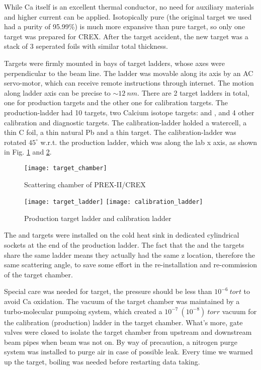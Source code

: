 While Ca itself is an excellent thermal conductor, no need for auxiliary 
materials and higher current can be applied. Isotopically pure \Ca (the original
target we used had a purity of 95.99\%) is much more 
expansive than pure \Pb target, so only one \Ca target was prepared for CREX. 
After the target accident, 
the new \Ca target was a stack of 3 seperated foils with similar total thickness.

Targets were firmly mounted in bays of target ladders, whose axes were 
perpendicular to the beam line. The ladder was movable along its axis by an 
AC servo-motor, which can receive remote instructions through internet. 
The motion along ladder axis can be precise to $\sim12\ nm$.
There are 2 target ladders in total, one for production targets and the other
one for calibration targets. The production-ladder had 10 \Pb targets, 
two Calcium isotope targets: \ca and \Ca, and 4 other calibration and diagnostic
targets. The calibration-ladder holded a watercell, a thin C foil, a thin natural 
Pb and a thin \ca target.
The calibration-ladder was rotated $45^\circ$ w.r.t. the production ladder, 
which was along the lab x axis, as shown in Fig. \ref{fig:scattering_chamber}
and \ref{fig:target_ladder}.

\begin{figure}[h!]
    \centering
    \texttt{[image: target\_chamber]}
    \caption{Scattering chamber of PREX-II/CREX}
    \label{fig:scattering_chamber}
\end{figure}
\begin{figure}[h!]
    \centering
    \texttt{[image: target\_ladder]}
    \texttt{[image: calibration\_ladder]}
    \caption{Production target ladder and calibration ladder}
    \label{fig:target_ladder}
\end{figure}

The \ca and \Ca targets were installed on the cold heat sink in dedicated cylindrical 
sockets at the end of the production ladder. %
The fact that the \Ca and the \Pb 
targets share the same ladder means they actually had the same z location,
therefore the same scattering angle, to save some effort in the re-installation 
and re-commission of the target chamber.

Special care was needed for \Ca target, the pressure should be less than $10^{-6}\ tort$
to avoid Ca oxidation. The vacuum of the target chamber was maintained by a 
turbo-molecular pumpoing system, which created a $10^{-7}\ (10^{-8})\ torr$ vacuum 
for the calibration (production) ladder in the target chamber. What's more,
gate valves were closed to isolate the target chamber from upstream and downstream
beam pipes when beam was not on. By way of precaution, a nitrogen purge system 
was installed to purge air in case of possible leak.
Every time we warmed up the \Ca target, boiling was needed before restarting data taking.

